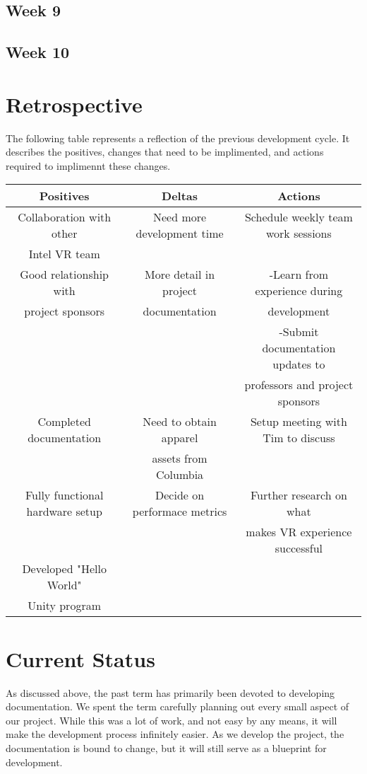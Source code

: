 \documentclass[10pt,journal,compsoc,onecolumn, draftclsnofoot]{IEEEtran}
\begin{document}
\subsection{Week 9}
\subsection{Week 10}

\section{Retrospective}
The following table represents a reflection of the previous development cycle.
It describes the positives, changes that need to be implimented, and actions required to implimennt these changes.

\begin{center}
\begin{tabular}{ |c || c | c | }
 \hline
 Positives & Deltas & Actions \\
 \hline \hline
 Collaboration with other & Need more development time & Schedule weekly team work sessions\\
 Intel VR team & & \\ \hline
 Good relationship with & More detail in project & -Learn from experience during \\ project sponsors & documentation & development \\
 & & -Submit documentation updates to \\
 & & professors and project sponsors\\ \hline
 Completed documentation & Need to obtain apparel & Setup meeting with Tim to discuss\\
 & assets from Columbia & \\ \hline
 Fully functional hardware setup & Decide on performace metrics & Further research on what\\
 & & makes VR experience successful\\ \hline
 Developed "Hello World" & & \\
 Unity program & & \\
 \hline
\end{tabular}
\end{center}
\section{Current Status}
As discussed above, the past term has primarily been devoted to developing documentation.
We spent the term carefully planning out every small aspect of our project.
While this was a lot of work, and not easy by any means, it will make the development process infinitely easier.
As we develop the project, the documentation is bound to change, but it will still serve as a blueprint for development.
\end{document}
